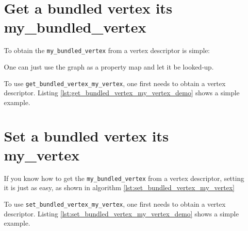 

\section{Get a bundled vertex its my\_bundled\_vertex}
\label{subsec:get_bundled_vertex_my_vertex}

To obtain the \verb;my_bundled_vertex; from a vertex descriptor is simple:



One can just use the graph as a property map and let it be looked-up.

To use \verb;get_bundled_vertex_my_vertex;, 
one first needs to obtain a vertex descriptor.
Listing \ref{lst:get_bundled_vertex_my_vertex_demo}
shows a simple example.



\section{Set a bundled vertex its my\_vertex}
\label{subsec:set_bundled_vertex_my_vertex}

If you know how to get the \verb;my_bundled_vertex; from a vertex descriptor,
setting it is just as easy, 
as shown in algorithm \ref{lst:set_bundled_vertex_my_vertex}



To use \verb;set_bundled_vertex_my_vertex;, 
one first needs to obtain a vertex descriptor.
Listing \ref{lst:set_bundled_vertex_my_vertex_demo}
shows a simple example.

